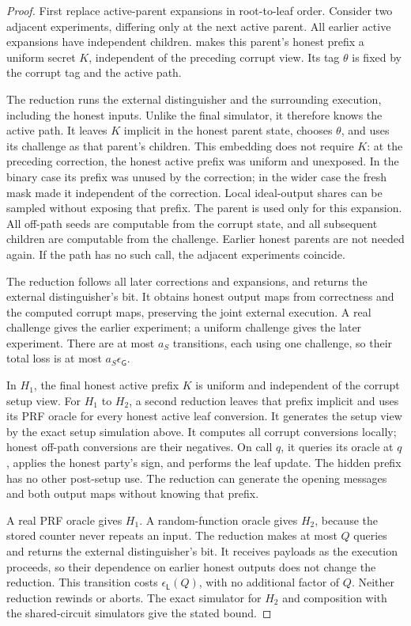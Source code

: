 \begin{proof}
First replace active-parent expansions in root-to-leaf order. Consider
two adjacent experiments, differing only at the next active parent.
All earlier active expansions have independent children.
 makes this parent's honest
prefix a uniform secret $K$, independent of the preceding corrupt view.
Its tag $\theta$ is fixed by the corrupt tag and the active path.

The reduction runs the external distinguisher and the surrounding execution,
including the honest inputs. Unlike the final simulator, it therefore
knows the active path. It leaves $K$ implicit in the honest parent state,
chooses $\theta$, and uses its challenge as that parent's children.
This embedding does not require $K$: at the preceding correction, the
honest active prefix was uniform and unexposed. In the binary case its
prefix was unused by the correction; in the wider case the fresh mask
made it independent of the correction. Local ideal-output shares can be
sampled without exposing that prefix.
The parent is used only for this expansion. All off-path seeds are
computable from the corrupt state, and all subsequent children are
computable from the challenge. Earlier honest parents are not needed again.
If the path has no such call, the adjacent experiments coincide.

The reduction follows all later corrections and expansions, and returns
the external distinguisher's bit. It obtains honest output maps from
correctness and the computed corrupt maps, preserving the joint external
execution. A real challenge gives the earlier experiment; a uniform
challenge gives the later experiment. There are at most $a_S$ transitions,
each using one challenge, so their total loss is at most
$a_S\epsilon_{\mathsf G}$.

In $H_1$, the final honest active prefix $K$ is uniform and independent
of the corrupt setup view. For $H_1$ to $H_2$, a second reduction leaves
that prefix implicit and uses its PRF oracle for every honest active
leaf conversion. It generates the setup view by the exact setup simulation
above. It computes all corrupt conversions locally; honest off-path
conversions are their negatives. On call $q$, it queries its oracle at
$q$, applies the honest party's sign, and performs the leaf update.
The hidden prefix has no other post-setup use. The reduction can generate
the opening messages and both output maps without knowing that prefix.

A real PRF oracle gives $H_1$. A random-function oracle gives $H_2$,
because the stored counter never repeats an input. The reduction makes
at most $Q$ queries and returns the external distinguisher's bit.
It receives payloads as the execution proceeds, so their dependence on
earlier honest outputs does not change the reduction. This transition
costs $\epsilon_{\mathsf L}(Q)$, with no additional factor of $Q$.
Neither reduction rewinds or aborts. The exact simulator for $H_2$ and
composition with the shared-circuit simulators give the stated bound.
\end{proof}

